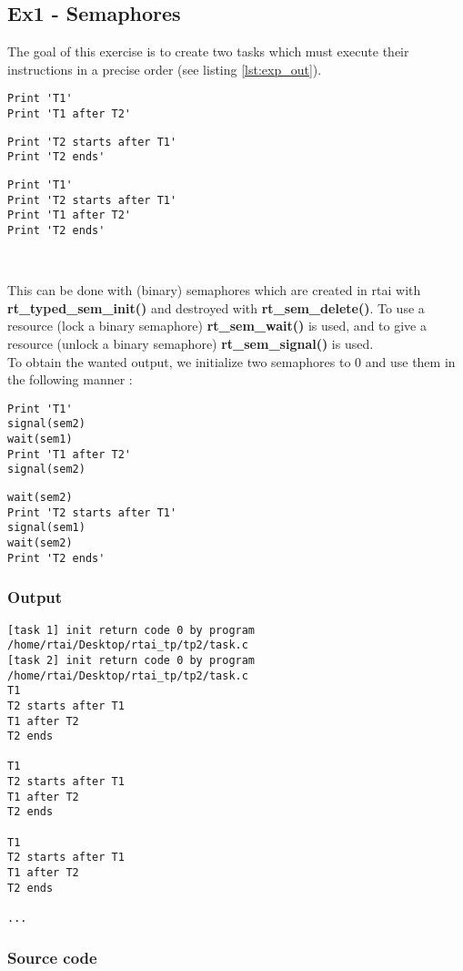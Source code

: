 \subsection{Ex1 - Semaphores}
The goal of this exercise is to create two tasks which must execute their instructions in a precise order (see listing \ref{lst:exp_out}).

\begin{multicols}{2}
\begin{lstlisting}[numbers=none,caption = {Task 1}]
Print 'T1'
Print 'T1 after T2'
\end{lstlisting}

\begin{lstlisting}[numbers=none, caption={Task 2}]
Print 'T2 starts after T1'
Print 'T2 ends'
\end{lstlisting}
\end{multicols}

\begin{lstlisting}[numbers=none, caption={Expected output}, label={lst:exp_out}]
Print 'T1'
Print 'T2 starts after T1'
Print 'T1 after T2'
Print 'T2 ends'
\end{lstlisting}
\

This can be done with (binary) semaphores which are created in rtai with \textbf{rt\_typed\_sem\_init()} and destroyed with \textbf{rt\_sem\_delete()}. To use a resource (lock a binary semaphore) \textbf{rt\_sem\_wait()} is used, and to give a resource (unlock a binary semaphore) \textbf{rt\_sem\_signal()} is used.\\

To obtain the wanted output, we initialize two semaphores to 0 and use them in the following manner :
\begin{multicols}{2}
\begin{lstlisting}[numbers=none,caption = {Task 1}]
Print 'T1'
signal(sem2)
wait(sem1)
Print 'T1 after T2'
signal(sem2)
\end{lstlisting}

\begin{lstlisting}[numbers=none, caption={Task 2}]
wait(sem2)
Print 'T2 starts after T1'
signal(sem1)
wait(sem2)
Print 'T2 ends'
\end{lstlisting}
\end{multicols}

\subsubsection{Output}
\begin{lstlisting}[keywordstyle=\color{black}]
[task 1] init return code 0 by program /home/rtai/Desktop/rtai_tp/tp2/task.c
[task 2] init return code 0 by program /home/rtai/Desktop/rtai_tp/tp2/task.c
T1
T2 starts after T1
T1 after T2
T2 ends

T1
T2 starts after T1
T1 after T2
T2 ends

T1
T2 starts after T1
T1 after T2
T2 ends

...
\end{lstlisting}

\subsubsection{Source code}

